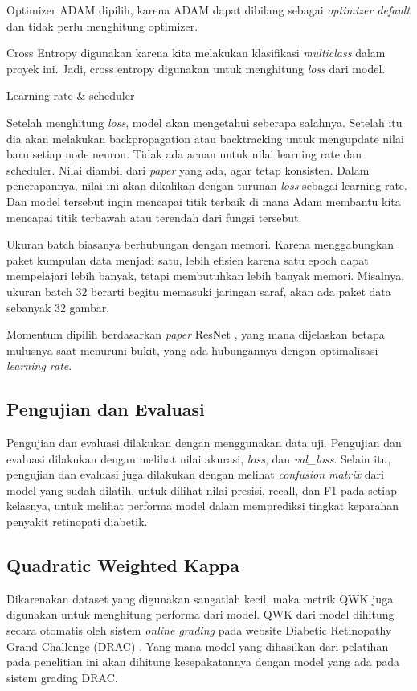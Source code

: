 Optimizer ADAM dipilih, karena ADAM dapat dibilang sebagai \emph{optimizer default} dan tidak perlu menghitung optimizer.

Cross Entropy digunakan karena kita melakukan klasifikasi \emph{multiclass} dalam proyek ini. Jadi, cross entropy digunakan untuk menghitung \emph{loss} dari model.

Learning rate \& scheduler

Setelah menghitung \emph{loss}, model akan mengetahui seberapa salahnya. Setelah itu dia akan melakukan backpropagation atau backtracking untuk mengupdate nilai baru setiap node neuron. Tidak ada acuan untuk nilai learning rate dan scheduler. Nilai diambil dari \emph{paper} yang ada, agar tetap konsisten. Dalam penerapannya, nilai ini akan dikalikan dengan turunan \emph{loss} sebagai learning rate. Dan model tersebut ingin mencapai titik terbaik di mana Adam membantu kita mencapai titik terbawah atau terendah dari fungsi tersebut.

Ukuran batch biasanya berhubungan dengan memori. Karena menggabungkan paket kumpulan data menjadi satu, lebih efisien karena satu epoch dapat mempelajari lebih banyak, tetapi membutuhkan lebih banyak memori. Misalnya, ukuran batch 32 berarti begitu memasuki jaringan saraf, akan ada paket data sebanyak 32 gambar.

Momentum dipilih berdasarkan \emph{paper} ResNet \parencite{ResNet}, yang mana dijelaskan betapa mulusnya saat menuruni bukit, yang ada hubungannya dengan optimalisasi \emph{learning rate}.


\subsection{Pengujian dan Evaluasi}
\label{sec:326}
Pengujian dan evaluasi dilakukan dengan menggunakan data uji. Pengujian dan evaluasi dilakukan dengan melihat nilai akurasi, \emph{loss}, dan \emph{val\_loss}. Selain itu, pengujian dan evaluasi juga dilakukan dengan melihat \emph{confusion matrix} dari model yang sudah dilatih, untuk dilihat nilai presisi, recall, dan F1 pada setiap kelasnya, untuk melihat performa model dalam memprediksi tingkat keparahan penyakit retinopati diabetik.

\subsection{Quadratic Weighted Kappa}
Dikarenakan dataset yang digunakan sangatlah kecil, maka metrik QWK juga digunakan untuk menghitung performa dari model. QWK dari model dihitung secara otomatis oleh sistem \emph{online grading} pada website Diabetic Retinopathy Grand Challenge (DRAC) \parencite{drac_challenge_2023_10280359}. Yang mana model yang dihasilkan dari pelatihan pada penelitian ini akan dihitung kesepakatannya dengan model yang ada pada sistem grading DRAC.

